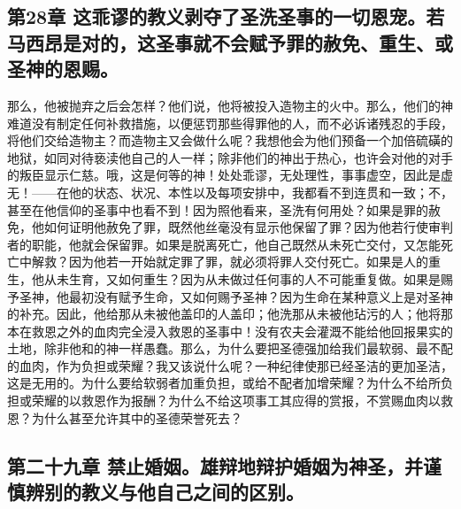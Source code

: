 \subsection{第28章 这乖谬的教义剥夺了圣洗圣事的一切恩宠。若马西昂是对的，这圣事就不会赋予罪的赦免、重生、或圣神的恩赐。}

那么，他被抛弃之后会怎样？他们说，他将被投入造物主的火中。那么，他们的神难道没有制定任何补救措施，以便惩罚那些得罪他的人，而不必诉诸残忍的手段，将他们交给造物主？而造物主又会做什么呢？我想他会为他们预备一个加倍硫磺的地狱，如同对待亵渎他自己的人一样；除非他们的神出于热心，也许会对他的对手的叛臣显示仁慈。哦，这是何等的神！处处乖谬，无处理性，事事虚空，因此是虚无！——在他的状态、状况、本性以及每项安排中，我都看不到连贯和一致；不，甚至在他信仰的圣事中也看不到！因为照他看来，圣洗有何用处？如果是罪的赦免，他如何证明他赦免了罪，既然他丝毫没有显示他保留了罪？因为他若行使审判者的职能，他就会保留罪。如果是脱离死亡，他自己既然从未死亡交付，又怎能死亡中解救？因为他若一开始就定罪了罪，就必须将罪人交付死亡。如果是人的重生，他从未生育，又如何重生？因为从未做过任何事的人不可能重复做。如果是赐予圣神，他最初没有赋予生命，又如何赐予圣神？因为生命在某种意义上是对圣神的补充。因此，他给那从未被他盖印的人盖印；他洗那从未被他玷污的人；他将那本在救恩之外的血肉完全浸入救恩的圣事中！没有农夫会灌溉不能给他回报果实的土地，除非他和的神一样愚蠢。那么，为什么要把圣德强加给我们最软弱、最不配的血肉，作为负担或荣耀？我又该说什么呢？一种纪律使那已经圣洁的更加圣洁，这是无用的。为什么要给软弱者加重负担，或给不配者加增荣耀？为什么不给所负担或荣耀的以救恩作为报酬？为什么不给这项事工其应得的赏报，不赏赐血肉以救恩？为什么甚至允许其中的圣德荣誉死去？\par


\subsection{第二十九章 禁止婚姻。雄辩地辩护婚姻为神圣，并谨慎辨别的教义与他自己之间的区别。}

